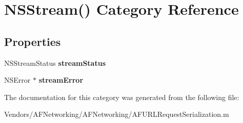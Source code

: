 \hypertarget{category_n_s_stream_07_08}{}\section{N\+S\+Stream() Category Reference}
\label{category_n_s_stream_07_08}
\subsection*{Properties}
\begin{DoxyCompactItemize}
\item 
\hypertarget{category_n_s_stream_07_08_a380fb254540df401c389d64b0159d9da}{}N\+S\+Stream\+Status {\bfseries stream\+Status}\label{category_n_s_stream_07_08_a380fb254540df401c389d64b0159d9da}

\item 
\hypertarget{category_n_s_stream_07_08_a44d8a05bedbaee9cef1399e6ecf7b67a}{}N\+S\+Error $\ast$ {\bfseries stream\+Error}\label{category_n_s_stream_07_08_a44d8a05bedbaee9cef1399e6ecf7b67a}

\end{DoxyCompactItemize}


The documentation for this category was generated from the following file\+:\begin{DoxyCompactItemize}
\item 
Vendors/\+A\+F\+Networking/\+A\+F\+Networking/A\+F\+U\+R\+L\+Request\+Serialization.\+m\end{DoxyCompactItemize}

